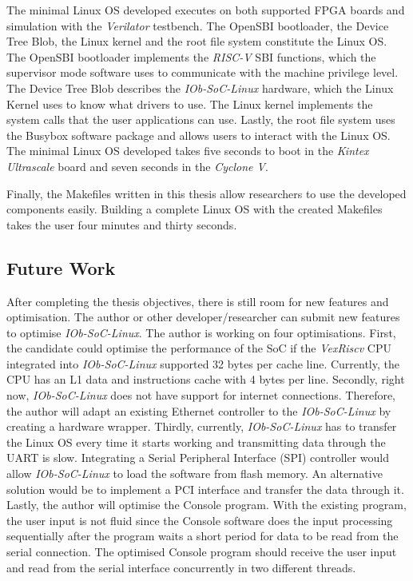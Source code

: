 The minimal Linux OS developed executes on both supported FPGA boards and simulation with the \textit{Verilator} testbench. The OpenSBI bootloader, the Device Tree Blob, the Linux kernel and the root file system constitute the Linux OS. The OpenSBI bootloader implements the \textit{RISC-V} SBI functions, which the supervisor mode software uses to communicate with the machine privilege level. The Device Tree Blob describes the \textit{IOb-SoC-Linux} hardware, which the Linux Kernel uses to know what drivers to use. The Linux kernel implements the system calls that the user applications can use. Lastly, the root file system uses the Busybox software package and allows users to interact with the Linux OS. The minimal Linux OS developed takes five seconds to boot in the \textit{Kintex Ultrascale} board and seven seconds in the \textit{Cyclone V}.

Finally, the Makefiles written in this thesis allow researchers to use the developed components easily. Building a complete Linux OS with the created Makefiles takes the user four minutes and thirty seconds.

\subsection{Future Work}
After completing the thesis objectives, there is still room for new features and optimisation. The author or other developer/researcher can submit new features to optimise \textit{IOb-SoC-Linux}. The author is working on four optimisations. First, the candidate could optimise the performance of the SoC if the \textit{VexRiscv} CPU integrated into \textit{IOb-SoC-Linux} supported 32 bytes per cache line. Currently, the CPU has an L1 data and instructions cache with 4 bytes per line. Secondly, right now, \textit{IOb-SoC-Linux} does not have support for internet connections. Therefore, the author will adapt an existing Ethernet controller to the \textit{IOb-SoC-Linux} by creating a hardware wrapper. Thirdly, currently, \textit{IOb-SoC-Linux} has to transfer the Linux OS every time it starts working and transmitting data through the UART is slow. Integrating a Serial Peripheral Interface (SPI) controller would allow \textit{IOb-SoC-Linux} to load the software from flash memory. An alternative solution would be to implement a PCI interface and transfer the data through it. Lastly, the author will optimise the Console program. With the existing program, the user input is not fluid since the Console software does the input processing sequentially after the program waits a short period for data to be read from the serial connection. The optimised Console program should receive the user input and read from the serial interface concurrently in two different threads.

